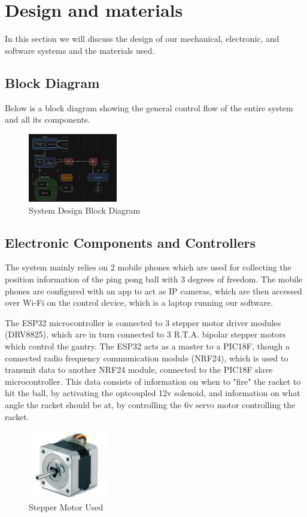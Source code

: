 \chapter{Design and materials}
In this section we will discuss the design of our mechanical, electronic, and software systems and the materials used.

\section{Block Diagram}
Below is a block diagram showing the general control flow of the entire system and all its components.

\begin{figure}[h]
	\centering\includegraphics[height=3cm]{./images/blockdiagram}
	\caption{System Design Block Diagram}
\end{figure}

\section{Electronic Components and Controllers}
The system mainly relies on 2 mobile phones which are used for collecting the position information of the ping pong ball with 3 degrees of freedom. The mobile phones are configured with an app to act as IP cameras, which are then accessed over Wi-Fi on the control device, which is a laptop running our software.

The ESP32 microcontroller is connected to 3 stepper motor driver modules (DRV8825), which are in turn connected to 3 R.T.A. bipolar stepper motors which control the gantry. The ESP32 acts as a master to a PIC18F, though a connected radio frequency communication module (NRF24), which is used to transmit data to another NRF24 module, connected to the PIC18F slave microcontroller. This data consists of information on when to "fire" the racket to hit the ball, by activating the optcoupled 12v solenoid, and information on what angle the racket should be at, by controlling the 6v servo motor controlling the racket.

\begin{figure}[h]
	\centering\includegraphics[height=3cm]{./images/steppermotor}
	\caption{Stepper Motor Used}
\end{figure}

